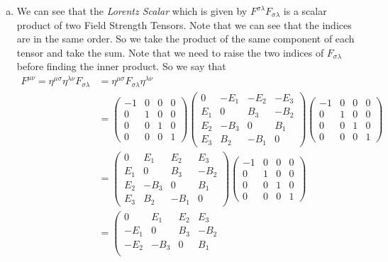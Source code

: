\documentclass[11pt]{article}
\numberwithin{equation}{section}
\begin{document}
\begin{enumerate}[(a)]
\item
We can see that the \emph{Lorentz Scalar} which is given by $F^{\sigma\lambda}F_{\sigma\lambda}$ is a scalar product of two Field Strength Tensors. Note that we can see that the indices are in the same order. So we take the product of the same component of each tensor and take the sum. Note that we need to raise the two indices of $F_{\sigma\lambda}$ before finding the inner product. So we say that
\begin{align*}
F^{\mu\nu} = \eta^{\mu\sigma}\eta^{\lambda\nu}F_{\sigma\lambda} &= \eta^{\mu\sigma}F_{\sigma\lambda}\eta^{\lambda\nu}\\
&= \left(\begin{array}{cccc}
		-1 &0 &0 &0\\
		0 &1 &0 &0\\
		0 &0 &1 &0\\
		0 &0 &0 &1
		\end{array}\right)
		\left(\begin{array}{cccc}
		0 &-E_1 &-E_2 &-E_3\\
		E_1 &0 &B_3 &-B_2\\
		E_2 &-B_3 &0 &B_1\\
		E_3 &B_2 &-B_1 &0
		\end{array}\right)
		\left(\begin{array}{cccc}
		-1 &0 &0 &0\\
		0 &1 &0 &0\\
		0 &0 &1 &0\\
		0 &0 &0 &1
		\end{array}\right)\\
&= 		\left(\begin{array}{cccc}
		0 &E_1 &E_2 &E_3\\
		E_1 &0 &B_3 &-B_2\\
		E_2 &-B_3 &0 &B_1\\
		E_3 &B_2 &-B_1 &0
		\end{array}\right)
		\left(\begin{array}{cccc}
		-1 &0 &0 &0\\
		0 &1 &0 &0\\
		0 &0 &1 &0\\
		0 &0 &0 &1
		\end{array}\right)\\
&= 		\left(\begin{array}{cccc}
		0 &E_1 &E_2 &E_3\\
		-E_1 &0 &B_3 &-B_2\\
		-E_2 &-B_3 &0 &B_1\\

\end{array}
\end{align*}
\end{enumerate}
\end{document}
